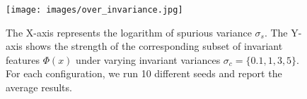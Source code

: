 \begin{figure}[t]
	\centering
 \texttt{[image: images/over\_invariance.jpg]}
	\caption{
  The X-axis represents the logarithm of spurious variance $\sigma_s$.
  The Y-axis shows the strength of the corresponding subset of invariant features $\Phi(x)$ under varying invariant variances $\sigma_c = \{0.1, 1, 3, 5\}$.
  For each configuration, we run 10 different seeds and report the average results.
	}
	\label{fig:over_invariance}
\end{figure}

